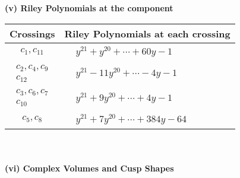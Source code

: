 \documentclass[1p]{elsarticle_modified}
\theoremstyle{definition}
\begin{document}
\newpage\renewcommand{\arraystretch}{1}
\flushleft \textbf{(v) Riley Polynomials at the component}\newline \\
\begin{tabular}{m{50pt}|m{274pt}}
Crossings & \hspace{64pt}Riley Polynomials at each crossing \\
\hline $$\begin{aligned}c_{1},c_{11}\end{aligned}$$&$\begin{aligned}
&y^{21}+y^{20}+\cdots+60 y-1
\end{aligned}$\\
\hline $$\begin{aligned}c_{2},c_{4},c_{9}\\c_{12}\end{aligned}$$&$\begin{aligned}
&y^{21}-11 y^{20}+\cdots-4 y-1
\end{aligned}$\\
\hline $$\begin{aligned}c_{3},c_{6},c_{7}\\c_{10}\end{aligned}$$&$\begin{aligned}
&y^{21}+9 y^{20}+\cdots+4 y-1
\end{aligned}$\\
\hline $$\begin{aligned}c_{5},c_{8}\end{aligned}$$&$\begin{aligned}
&y^{21}+7 y^{20}+\cdots+384 y-64
\end{aligned}$\\
\hline
\end{tabular}\\~\\
\newpage\flushleft \textbf{(vi) Complex Volumes and Cusp Shapes}
\end{document}
